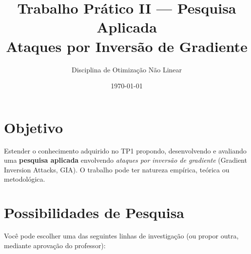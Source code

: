 \documentclass[12pt]{article}
\title{Trabalho Prático II — Pesquisa Aplicada\\Ataques por Inversão de Gradiente}
\author{Disciplina de Otimização Não Linear}
\date{\today}
\begin{document}
\maketitle

\section*{Objetivo}

Estender o conhecimento adquirido no TP1 propondo, desenvolvendo e avaliando uma \textbf{pesquisa aplicada} envolvendo \emph{ataques por inversão de gradiente} (Gradient Inversion Attacks, GIA). O trabalho pode ter natureza empírica, teórica ou metodológica.

\section*{Possibilidades de Pesquisa}

Você pode escolher uma das seguintes linhas de investigação (ou propor outra, mediante aprovação do professor):
\end{document}
